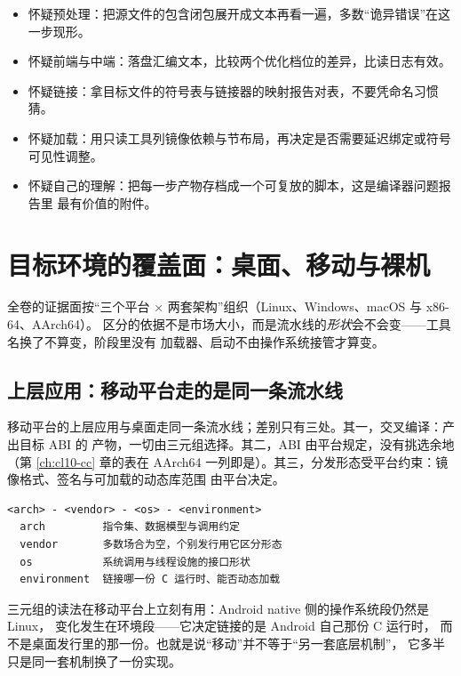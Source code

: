 \documentclass[12pt,a4paper,fontset=fandol]{ctexbook}
\newcommand{\Mx}[1]{\textsf{#1}}
\newcommand{\Nix}{\textsf{Linux}}
\newcommand{\Win}{\textsf{Windows}}
\newcommand{\Mac}{\textsf{macOS}}
\newcommand{\xSixtyFour}{\textsf{x86-64}}
\newcommand{\ArmSixtyFour}{\textsf{AArch64}}
\begin{document}
\begin{bestpractice}[title={按阶段定位问题的最短路径}]
\begin{itemize}
  \item 怀疑预处理：把源文件的包含闭包展开成文本再看一遍，多数“诡异错误”在这一步现形。
  \item 怀疑前端与中端：落盘汇编文本，比较两个优化档位的差异，比读日志有效。
  \item 怀疑链接：拿目标文件的符号表与链接器的映射报告对表，不要凭命名习惯猜。
  \item 怀疑加载：用只读工具列镜像依赖与节布局，再决定是否需要延迟绑定或符号可见性调整。
  \item 怀疑自己的理解：把每一步产物存档成一个可复放的脚本，这是编译器问题报告里
    最有价值的附件。
\end{itemize}
\end{bestpractice}

\section{目标环境的覆盖面：桌面、移动与裸机}\label{sec:cl01-targetenv}

全卷的证据面按“三个平台 × 两套架构”组织（\Nix、\Win、\Mac{} 与 \xSixtyFour、\ArmSixtyFour）。
区分的依据不是市场大小，而是流水线的\emph{形状}会不会变——工具名换了不算变，阶段里没有
加载器、启动不由操作系统接管才算变。

\subsection{上层应用：移动平台走的是同一条流水线}\label{sec:cl01-mobile}

移动平台的上层应用与桌面走同一条流水线；差别只有三处。其一，交叉编译：产出目标 ABI 的
产物，一切由三元组选择。其二，ABI 由平台规定，没有挑选余地（第 \ref{ch:cl10-cc} 章的表在
\ArmSixtyFour{} 一列即是）。其三，分发形态受平台约束：镜像格式、签名与可加载的动态库范围
由平台决定。

\begin{lstlisting}[style=outstyle, caption={目标三元组的四段各决定什么（示意形状，不是某个工具的实际字符串）}]
<arch> - <vendor> - <os> - <environment>
  arch         指令集、数据模型与调用约定
  vendor       多数场合为空，个别发行用它区分形态
  os           系统调用与线程设施的接口形状
  environment  链接哪一份 C 运行时、能否动态加载
\end{lstlisting}

三元组的读法在移动平台上立刻有用：\Mx{Android} native 侧的操作系统段仍然是 \Nix{}，
变化发生在环境段——它决定链接的是 \Mx{Android} 自己那份 C 运行时，
而不是桌面发行里的那一份。也就是说“移动”并不等于“另一套底层机制”，
它多半只是同一套机制换了一份实现。
\end{document}
